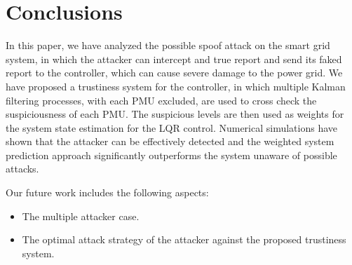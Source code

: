 \documentclass[journal,10pt,twocolumn]{IEEEtran}
\begin{document}
\section{Conclusions}\label{sec:conclusion}
In this paper, we have analyzed the possible spoof attack on the smart grid system, in which the attacker can intercept and true report and send its faked report to the controller, which can cause severe damage to the power grid. We have proposed a trustiness system for the controller, in which multiple Kalman filtering processes, with each PMU excluded, are used to cross check the suspiciousness of each PMU. The suspicious levels are then used as weights for the system state estimation for the LQR control. Numerical simulations have shown that the attacker can be effectively detected and the weighted system prediction approach significantly outperforms the system unaware of possible attacks.

Our future work includes the following aspects:
\begin{itemize}
\item The multiple attacker case.
\item The optimal attack strategy of the attacker against the proposed trustiness system.
\end{itemize}
\end{document}
